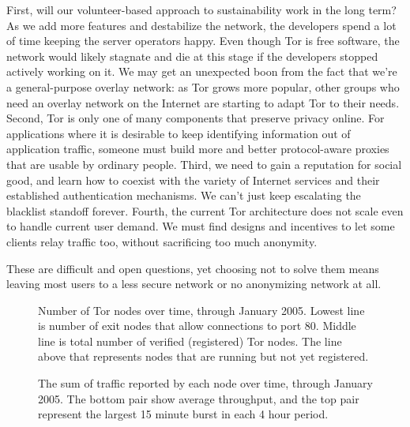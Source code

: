 \documentclass{llncs}
\begin{document}
First, will our volunteer-based approach to sustainability work in the
long term? As we add more features and destabilize the network, the
developers spend a lot of time keeping the server operators happy. Even
though Tor is free software, the network would likely stagnate and die at
this stage if the developers stopped actively working on it. We may get
an unexpected boon from the fact that we're a general-purpose overlay
network: as Tor grows more popular, other groups who need an overlay
network on the Internet are starting to adapt Tor to their needs.
%
Second, Tor is only one of many components that preserve privacy online.
For applications where it is desirable to
keep identifying information out of application traffic, someone must build
more and better protocol-aware proxies that are usable by ordinary people.
%
Third, we need to gain a reputation for social good, and learn how to
coexist with the variety of Internet services and their established
authentication mechanisms. We can't just keep escalating the blacklist
standoff forever.
%
Fourth, the current Tor
architecture does not scale even to handle current user demand. We must
find designs and incentives to let some clients relay traffic too, without
sacrificing too much anonymity.

These are difficult and open questions, yet choosing not to solve them
means leaving most users to a less secure network or no anonymizing
network at all.

 

\clearpage
\appendix

\begin{figure}[t]
\centering
\mbox{}
\caption{Number of Tor nodes over time, through January 2005. Lowest
line is number of exit
nodes that allow connections to port 80. Middle line is total number of
verified (registered) Tor nodes. The line above that represents nodes
that are running but not yet registered.}
\label{fig:graphnodes}
\end{figure}

\begin{figure}[t]
\centering
\mbox{}
\caption{The sum of traffic reported by each node over time, through
January 2005. The bottom
pair show average throughput, and the top pair represent the largest 15
minute burst in each 4 hour period.}
\label{fig:graphtraffic}
\end{figure}
\end{document}
